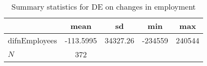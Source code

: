 \begin{table}[htbp]\centering
\def\sym#1{\ifmmode^{#1}\else\(^{#1}\)\fi}
\caption{Summary statistics for DE on changes in employment}
\begin{tabular}{l*{1}{cccc}}
\hline\hline
            &        mean&          sd&         min&         max\\
\hline
difnEmployees&   -113.5995&    34327.26&     -234559&      240544\\
\hline
\(N\)       &         372&            &            &            \\
\hline\hline
\end{tabular}
\end{table}
